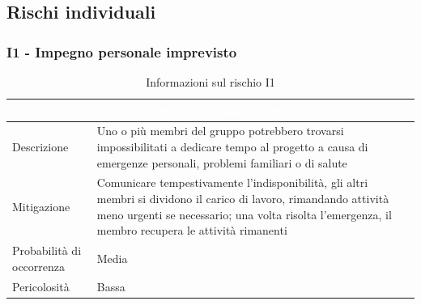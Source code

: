 \documentclass[a4paper, 11pt]{article}
\begin{document}
\subsection{Rischi individuali}


\subsubsection{I1 - Impegno personale imprevisto}
\begin{table}[H]
    \centering
    \begin{tabular}{|p{}|p{}|}
    	\hline
    	\multicolumn{2}{|c|}{\cellcolor{AccentColor}\textcolor{white}{\textbf{I1 - Impegno personale imprevisto}}} \\ 
        \hline
        Descrizione & Uno o più membri del gruppo potrebbero trovarsi impossibilitati a dedicare tempo al progetto a causa di emergenze personali, problemi familiari o di salute \\ 
        \hline
        Mitigazione & Comunicare tempestivamente l'indisponibilità, gli altri membri si dividono il carico di lavoro, rimandando attività meno urgenti se necessario; una volta risolta l'emergenza, il membro recupera le attività rimanenti \\ 
        \hline
        Probabilità di occorrenza & Media \\
        \hline
        Pericolosità & Bassa \\
        \hline
    \end{tabular}
    \caption{Informazioni sul rischio I1}
\end{table}
\end{document}
